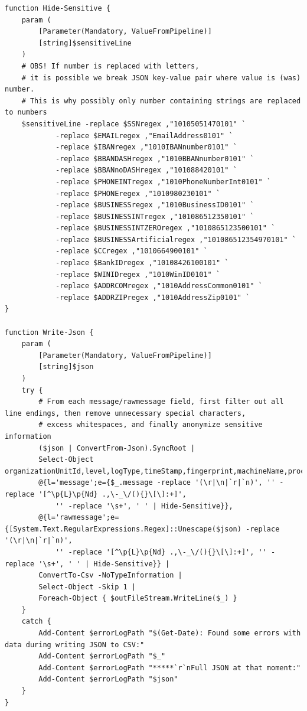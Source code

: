 \begin{Verbatim}[fontsize=\tiny]
function Hide-Sensitive {
    param (
        [Parameter(Mandatory, ValueFromPipeline)]
        [string]$sensitiveLine
    )
    # OBS! If number is replaced with letters,
    # it is possible we break JSON key-value pair where value is (was) number.
    # This is why possibly only number containing strings are replaced to numbers
    $sensitiveLine -replace $SSNregex ,"10105051470101" `
            -replace $EMAILregex ,"EmailAddress0101" `
            -replace $IBANregex ,"1010IBANnumber0101" `
            -replace $BBANDASHregex ,"1010BBANnumber0101" `
            -replace $BBANnoDASHregex ,"101088420101" `
            -replace $PHONEINTregex ,"1010PhoneNumberInt0101" `
            -replace $PHONEregex ,"1010980230101" `
            -replace $BUSINESSregex ,"1010BusinessID0101" `
            -replace $BUSINESSINTregex ,"101086512350101" `
            -replace $BUSINESSINTZEROregex ,"1010865123500101" `
            -replace $BUSINESSArtificialregex ,"101086512354970101" `
            -replace $CCregex ,"1010664900101" `
            -replace $BankIDregex ,"10108426100101" `
            -replace $WINIDregex ,"1010WinID0101" `
            -replace $ADDRCOMregex ,"1010AddressCommon0101" `
            -replace $ADDRZIPregex ,"1010AddressZip0101" `
}

function Write-Json {
    param (
        [Parameter(Mandatory, ValueFromPipeline)]
        [string]$json
    )
    try {
        # From each message/rawmessage field, first filter out all line endings, then remove unnecessary special characters,
        # excess whitespaces, and finally anonymize sensitive information
        ($json | ConvertFrom-Json).SyncRoot |
        Select-Object organizationUnitId,level,logType,timeStamp,fingerprint,machineName,processName,jobId,robotName,machineId,
        @{l='message';e={$_.message -replace '(\r|\n|`r|`n)', '' -replace '[^\p{L}\p{Nd} .,\-_\/(){}\[\]:+]',
            '' -replace '\s+', ' ' | Hide-Sensitive}},
        @{l='rawmessage';e={[System.Text.RegularExpressions.Regex]::Unescape($json) -replace '(\r|\n|`r|`n)',
            '' -replace '[^\p{L}\p{Nd} .,\-_\/(){}\[\]:+]', '' -replace '\s+', ' ' | Hide-Sensitive}} |
        ConvertTo-Csv -NoTypeInformation |
        Select-Object -Skip 1 |
        Foreach-Object { $outFileStream.WriteLine($_) }
    }
    catch {
        Add-Content $errorLogPath "$(Get-Date): Found some errors with data during writing JSON to CSV:"
        Add-Content $errorLogPath "$_"
        Add-Content $errorLogPath "*****`r`nFull JSON at that moment:"
        Add-Content $errorLogPath "$json"
    }
}


\end{Verbatim}
